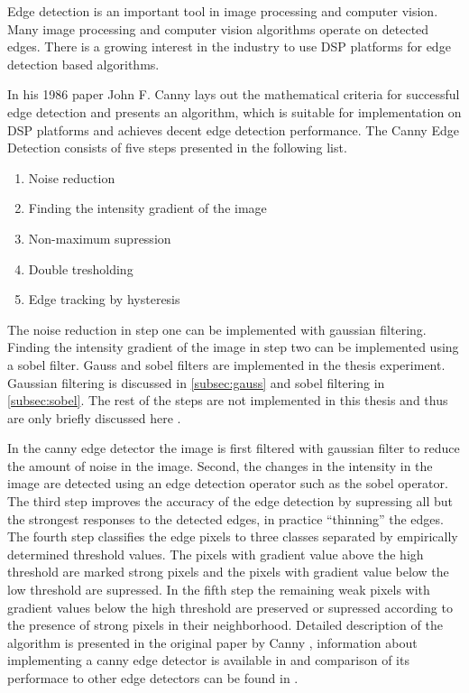 Edge detection is an important tool in image processing and computer vision. Many image processing and computer vision algorithms operate on detected edges. There is a growing interest in the industry to use DSP platforms for edge detection based algorithms. 

In his 1986 paper John F. Canny \cite{canny1986computational} lays out the mathematical criteria for successful edge detection and presents an algorithm, which is suitable for implementation on DSP platforms and achieves decent edge detection performance. The Canny Edge Detection consists of five steps presented in the following list.

\begin{enumerate}
    \item{Noise reduction}
    \item{Finding the intensity gradient of the image}
    \item{Non-maximum supression}
    \item{Double tresholding}
    \item{Edge tracking by hysteresis}
\end{enumerate}

The noise reduction in step one can be implemented with gaussian filtering. Finding the intensity gradient of the image in step two can be implemented using a sobel filter. Gauss and sobel filters are implemented in the thesis experiment. Gaussian filtering is discussed in \ref{subsec:gauss} and sobel filtering in \ref{subsec:sobel}. The rest of the steps are not implemented in this thesis and thus are only briefly discussed here .

In the canny edge detector the image is first filtered with gaussian filter to reduce the amount of noise in the image. Second, the changes in the intensity in the image are detected using an edge detection operator such as the sobel operator. The third step improves the accuracy of the edge detection by supressing all but the strongest responses to the detected edges, in practice ``thinning'' the edges. The fourth step classifies the edge pixels to three classes separated by empirically determined threshold values. The pixels with gradient value above the high threshold are marked strong pixels and the pixels with gradient value below the low threshold are supressed. In the fifth step the remaining weak pixels with gradient values below the high threshold are preserved or supressed according to the presence of strong pixels in their neighborhood. Detailed description of the algorithm is presented in the original paper by Canny \cite{canny1986computational}, information about implementing a canny edge detector is available in \cite{gonzalez2008digital} and comparison of its performace to other edge detectors can be found in \cite{maini2009study}.

